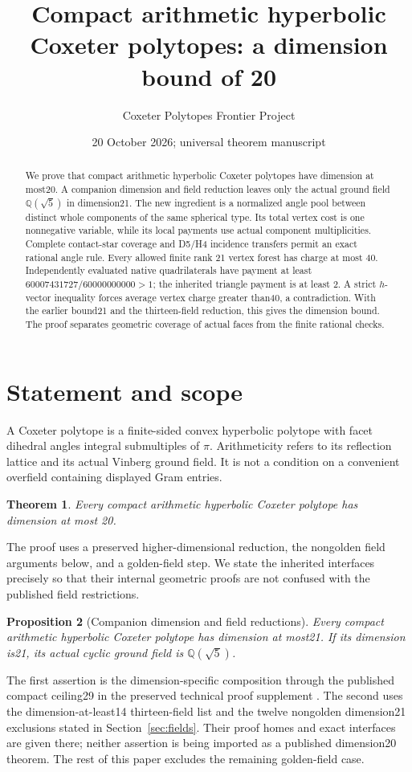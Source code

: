 \documentclass[11pt]{article}
\title{Compact arithmetic hyperbolic Coxeter polytopes:\linebreak
a dimension bound of 20}
\author{Coxeter Polytopes Frontier Project}
\date{20 October 2026; universal theorem manuscript}
\newtheorem{theorem}{Theorem}[section]
\newtheorem{proposition}[theorem]{Proposition}
\newcommand{\Q}{\mathbb Q}
\begin{document}
\maketitle
\begin{abstract}
We prove that compact arithmetic hyperbolic Coxeter polytopes have
dimension at most20. A companion dimension and field reduction leaves
only the actual ground field $\Q(\sqrt5)$ in dimension21.
The new ingredient is a normalized angle pool between distinct whole
components of the same spherical type. Its total vertex cost is one
nonnegative variable, while its local payments use actual component
multiplicities. Complete contact-star coverage and D5/H4 incidence
transfers permit an exact rational angle rule. Every
allowed finite rank 21 vertex forest has charge at most 40. Independently
evaluated native quadrilaterals have payment at least
$60007431727/60000000000>1$; the inherited triangle payment is at least 2.
A strict $h$-vector inequality forces average vertex charge greater than40,
a contradiction. With the earlier bound21 and the thirteen-field reduction,
this gives the dimension bound. The proof separates geometric coverage
of actual faces from the finite rational checks.
\end{abstract}

\section{Statement and scope}
A Coxeter polytope is a finite-sided convex hyperbolic polytope with facet
dihedral angles integral submultiples of $\pi$. Arithmeticity refers to
its reflection lattice and its actual Vinberg ground field. It is not a
condition on a convenient overfield containing displayed Gram entries.
\begin{theorem}\label{thm:main}
Every compact arithmetic hyperbolic Coxeter polytope has dimension at most 20.
\end{theorem}
The proof uses a preserved higher-dimensional reduction, the nongolden
field arguments below, and a golden-field step. We state the inherited
interfaces precisely so that their internal geometric proofs are not
confused with the published field restrictions.
\begin{proposition}[Companion dimension and field reductions]\label{prop:inherited}
Every compact arithmetic hyperbolic Coxeter polytope has dimension at
most21. If its dimension is21, its actual cyclic ground field is
$\Q(\sqrt5)$.
\end{proposition}
The first assertion is the dimension-specific composition through the
published compact ceiling29 in the preserved technical proof supplement
. The second uses the
dimension-at-least14 thirteen-field list and the twelve nongolden
dimension21 exclusions stated in Section~\ref{sec:fields}.
Their proof homes and exact interfaces are given there; neither
assertion is being imported as a published dimension20 theorem.
The rest of this paper excludes the remaining golden-field case.
\end{document}
